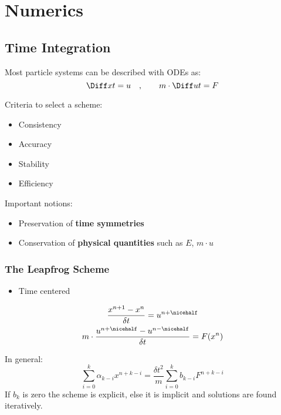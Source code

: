 
\section{Numerics} %
	
	\subsection{Time Integration} %
	
		Most particle systems can be described with ODEs as:
		\[
			\Diff x t = u \quad, \qquad m \cdot \Diff u t = F
		\]
		
		Criteria to select a scheme:
		\begin{itemize}
			\item Consistency
			\item Accuracy
			\item Stability
			\item Efficiency
		\end{itemize}
		
		Important notions:
		\begin{itemize}
			\item Preservation of \textbf{time symmetries}
			\item Conservation of \textbf{physical quantities} such as $E$, $m\cdot u$
		\end{itemize}
		
		\subsubsection{The Leapfrog Scheme} %
			
			\begin{itemize}
				\item Time centered
			\end{itemize}
			
			\begin{gather*}
				\frac{x^{n+1} - x^n}{\delta t} = u^{n+\nicehalf} \\
				m \cdot \frac{u^{n+\nicehalf} - u^{n-\nicehalf}}{\delta t} = F(x^n)
			\end{gather*}
			
			In general:
			\[
				\sum_{i=0}^k \alpha_{k-i} x^{n+k-i} = \frac{\delta t^2}{m} \sum_{i=0}^k b_{k-i} F^{n+k-i}
			\]
			If $b_k$ is zero the scheme is explicit, else it is implicit and solutions are found iteratively.
		
